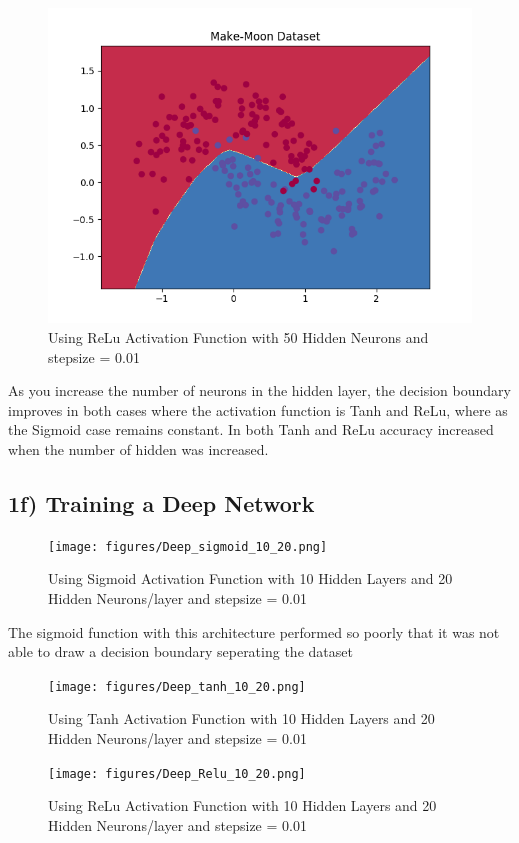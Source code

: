 \documentclass{article}
\begin{document}
	\begin{figure}[H]
		\centering
		\includegraphics[width=12cm]{figures/ReLu_nnh50.png}
		\caption{Using ReLu Activation Function with 50 Hidden Neurons and stepsize = 0.01}
	\end{figure}

As you increase the number of neurons in the hidden layer, the decision boundary improves in both cases where the activation function is Tanh and ReLu, where as the Sigmoid case remains constant. In both Tanh and ReLu accuracy increased when the number of hidden was increased. 

\subsection*{1f) Training a Deep Network}

	\begin{figure}[H]
		\centering
		\texttt{[image: figures/Deep\_sigmoid\_10\_20.png]}
		\caption{Using Sigmoid Activation Function with 10 Hidden Layers and 20 Hidden Neurons/layer and stepsize = 0.01}
	\end{figure}
The sigmoid function with this architecture performed so poorly that it was not able to draw a decision boundary seperating the dataset

	\begin{figure}[H]
		\centering
		\texttt{[image: figures/Deep\_tanh\_10\_20.png]}
		\caption{Using Tanh Activation Function with 10 Hidden Layers and 20 Hidden Neurons/layer and stepsize = 0.01}
	\end{figure}

	\begin{figure}[H]
		\centering
		\texttt{[image: figures/Deep\_Relu\_10\_20.png]}
		\caption{Using ReLu Activation Function with 10 Hidden Layers and 20 Hidden Neurons/layer and stepsize = 0.01}
	\end{figure}
\end{document}
